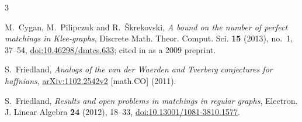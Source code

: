 \documentclass[11pt]{amsart}
\theoremstyle{remark}
\begin{document}
\begin{thebibliography}{3}

M.~Cygan, M.~Pilipczuk and R.~\v{S}krekovski,
\emph{A bound on the number of perfect matchings in Klee-graphs},
Discrete Math. Theor. Comput. Sci. \textbf{15} (2013), no.~1, 37--54,
\href{https://doi.org/10.46298/dmtcs.633}{doi:10.46298/dmtcs.633};
cited in \cite{Friedland2011} as a 2009 preprint.

S.~Friedland,
\emph{Analogs of the van der Waerden and Tverberg conjectures for haffnians},
\href{https://arxiv.org/abs/1102.2542}{arXiv:1102.2542v2}
[math.CO] (2011).

S.~Friedland,
\emph{Results and open problems in matchings in regular graphs},
Electron. J. Linear Algebra \textbf{24} (2012), 18--33,
\href{https://doi.org/10.13001/1081-3810.1577}
{doi:10.13001/1081-3810.1577}.

\end{thebibliography}
\end{document}
